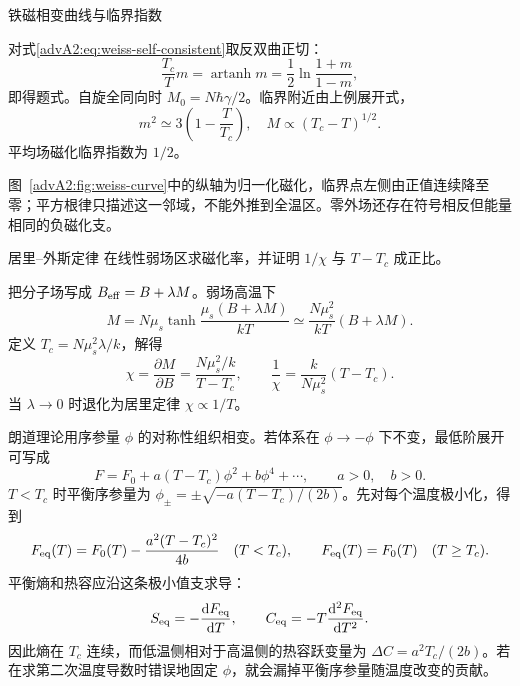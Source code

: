 {\begin{advexamplebox}{铁磁相变曲线与临界指数}
\AQWeissCurve
\end{advexamplebox}
\begin{advsolution}
对式\eqref{advA2:eq:weiss-self-consistent}取反双曲正切：
\[
 \frac{T_c}{T}m=\operatorname{artanh}m
 =\frac12\ln\frac{1+m}{1-m},
\]
即得题式。自旋全同向时
$\boxed{M_0=N\hbar\gamma/2}$。临界附近由上例展开式，
\[
 m^2\simeq3\left(1-\frac T{T_c}\right),
 \quad
 \boxed{M\propto(T_c-T)^{1/2}}.
\]
平均场磁化临界指数为 $1/2$。
\begin{center}\begin{minipage}{\linewidth}\centering
{}
\label{advA2:fig:weiss-curve}
\end{minipage}\end{center}

图~\ref{advA2:fig:weiss-curve}中的纵轴为归一化磁化，临界点左侧由正值连续降至零；平方根律只描述这一邻域，不能外推到全温区。零外场还存在符号相反但能量相同的负磁化支。
\end{advsolution}

\begin{advexamplebox}{居里--外斯定律}\label{advA2:ex:curie-weiss}
在线性弱场区求磁化率，并证明 $1/\chi$ 与 $T-T_c$ 成正比。

\AQCurieWeiss
\end{advexamplebox}
\begin{advsolution}
\AACurieWeiss

把分子场写成 $B_{\rm eff}=B+\lambda M$。弱场高温下
\[
 M=N\mu_s\tanh\frac{\mu_s(B+\lambda M)}{kT}
 \simeq\frac{N\mu_s^2}{kT}(B+\lambda M).
\]
定义 $T_c=N\mu_s^2\lambda/k$，解得
\[
 \boxed{\chi=\frac{\partial M}{\partial B}
 =\frac{N\mu_s^2/k}{T-T_c}},
 \qquad
 \boxed{\frac1\chi=\frac{k}{N\mu_s^2}(T-T_c)}.
\]
当 $\lambda\to0$ 时退化为居里定律 $\chi\propto1/T$。
\end{advsolution}

朗道理论用序参量 $\phi$ 的对称性组织相变。若体系在 $\phi\to-\phi$ 下不变，最低阶展开可写成
\[
 F=F_0+a(T-T_c)\phi^2+b\phi^4+\cdots,
 \qquad a>0,\quad b>0.
\]
$T<T_c$ 时平衡序参量为
$\phi_\pm=\pm\sqrt{-a(T-T_c)/(2b)}$。先对每个温度极小化，得到
\[
 F_{\rm eq}(T)=F_0(T)-\frac{a^2(T-T_c)^2}{4b}\quad(T<T_c),
 \qquad F_{\rm eq}(T)=F_0(T)\quad(T\ge T_c).
\]
平衡熵和热容应沿这条极小值支求导：
\[
 S_{\rm eq}=-\frac{\mathop{}\!\mathrm d F_{\rm eq}}{\mathop{}\!\mathrm d T},
 \qquad C_{\rm eq}=-T\frac{\mathop{}\!\mathrm d^2F_{\rm eq}}{\mathop{}\!\mathrm d T^2}.
\]
因此熵在 $T_c$ 连续，而低温侧相对于高温侧的热容跃变量为
$\Delta C=a^2T_c/(2b)$。若在求第二次温度导数时错误地固定 $\phi$，就会漏掉平衡序参量随温度改变的贡献。

}
